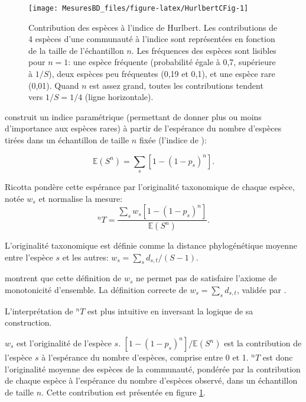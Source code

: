 \documentclass[
  11pt,
  french,
  a4paper,
  extrafontsizes,onecolumn,openright
  ]{memoir}
\begin{document}
\begin{figure}

{\centering \texttt{[image: MesuresBD\_files/figure-latex/HurlbertCFig-1]} 

}

\caption{Contribution des espèces à l'indice de Hurlbert. Les contributions de 4 espèces d'une communauté à l'indice sont représentées en fonction de la taille de l'échantillon \(n\). Les fréquences des espèces sont lisibles pour \(n = 1\): une espèce fréquente (probabilité égale à 0,7, supérieure à \(1/S\)), deux espèces peu fréquentes (0,19 et 0,1), et une espèce rare (0,01). Quand \(n\) est assez grand, toutes les contributions tendent vers \(1/S = 1/4\) (ligne horizontale).}\label{fig:HurlbertCFig}
\end{figure}

\normalsize

\textcite{Ricotta2004a} construit un indice paramétrique (permettant de donner plus ou moins d'importance aux espèces rares) à partir de l'espérance du nombre d'espèces tirées dans un échantillon de taille \(n\) fixée (l'indice de \textcite{Hurlbert1971}):

\begin{equation}
  \label{eq:ESn}
  {\mathbb E}\left( S^n \right)
  = \sum_s{\left[ 1-\left( 1-p_s \right)^n  \right]}.
\end{equation}

Ricotta pondère cette espérance par l'originalité taxonomique de chaque espèce, notée \(w_s\) et normalise la mesure:
\begin{equation}
  \label{eq:Ricotta2004a}
  ^n{T}
  = \frac{\sum_s{w_s \left[ 1-\left( 1-p_s \right)^n  \right]}}{{\mathbb E}\left( S^n \right)}.
\end{equation}

L'originalité taxonomique est définie comme la distance phylogénétique moyenne entre l'espèce \(s\) et les autres: \(w_s={\sum_s{d_{s,t}}}/{(S-1)}\).

\textcite{Weikard2006} montrent que cette définition de \(w_s\) ne permet pas de satisfaire l'axiome de monotonicité d'ensemble.
La définition correcte de \(w_s=\sum_s{d_{s,t}}\), validée par \textcite{Ricotta2006}.

L'interprétation de \(^n{T}\) est plus intuitive en inversant la logique de sa construction.

\(w_s\) est l'originalité de l'espèce \(s\).
\({[1-(1-p_s)^n]}/{{\mathbb E}(S^n)}\) est la contribution de l'espèce \(s\) à l'espérance du nombre d'espèces, comprise entre 0 et 1.
\(^n{T}\) est donc l'originalité moyenne des espèces de la communauté, pondérée par la contribution de chaque espèce à l'espérance du nombre d'espèces observé, dans un échantillon de taille \(n\).
Cette contribution est présentée en figure \ref{fig:HurlbertCFig}.
\end{document}
